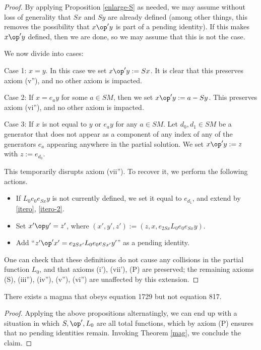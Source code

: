 \begin{proof}  By applying Proposition \ref{enlarge-S} as needed, we may assume without loss of generality that $Sx$ and $Sy$ are already defined (among other things, this removes the possibility that $x \op' y$ is part of a pending identity).  If this makes $x \op' y$ defined, then we are done, so we may assume that this is not the case.

We now divide into cases:

Case 1: $x=y$.  In this case we set $x \op' y := Sx$.  It is clear that this preserves axiom (v''), and no other axiom is impacted.

Case 2: If $x = e_a y$ for some $a \in SM$, then we set $x \op' y := a - Sy$.  This preserves axiom (vi''), and no other axiom is impacted.

Case 3: If $x$ is not equal to $y$ or $e_a y$ for any $a \in SM$.  Let $d_0, d_1 \in SM$ be a generator that does not appear as a component of any index of any of the generators $e_a$ appearing anywhere in the partial solution.  We set $x \op' y := z$ with $z := e_{d_0}$.

This temporarily disrupts axiom (vii'').  To recover it, we perform the following actions.
\begin{itemize}
  \item If $L_0 e_0 e_{Sx} y$ is not currently defined, we set it equal to $e_{d_1}$, and extend by \eqref{itero}, \eqref{itero-2}.
  \item Set $x' \op y' = z'$, where $(x',y',z') := (z, x, e_{2Sx} L_0 e_0 e_{Sx} y)$.
  \item Add ``$z' \op' x' = e_{2Sx'} L_0 e_0 e_{Sx'} y'$'' as a pending identity.
\end{itemize}

One can check that these definitions do not cause any collisions in the partial function $L_0$, and that axioms (i'), (vii'), (P) are preserved; the remaining axioms (S), (iii''), (iv''), (v''), (vi'') are unaffected by this extension.
\end{proof}


\begin{theorem}\label{1729_refute_817} There exists a magma that obeys equation 1729 but not equation 817.
\end{theorem}

\begin{proof}
  Applying the above propositions alternatingly, we can end up with a situation in which $S, \op', L_0$ are all total functions, which by axiom (P) ensures that no pending identities remain.  Invoking Theorem \ref{mag}, we conclude the claim.
\end{proof}
